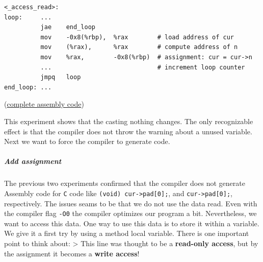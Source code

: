 \begin{verbatim}
<_access_read>:
loop:     ...
          jae    end_loop
          mov    -0x8(%rbp),  %rax        # load address of cur
          mov    (%rax),      %rax        # compute address of n
          mov    %rax,        -0x8(%rbp)  # assignment: cur = cur->n
          ...                             # increment loop counter
          jmpq   loop
end_loop: ...
\end{verbatim}

(\href{https://github.com/cksystemsgroup/SemanticLocality/blob/localizer/experiments/localizer/__meeting_20161130/assembly_tests/exp_ll_no_cast.txt}{complete
assembly code})

This experiment shows that the casting nothing changes. The only
recognizable effect is that the compiler does not throw the warning
about a unused variable. Next we want to force the compiler to generate
code.

\hypertarget{add-assignment}{\subparagraph{Add
assignment}\label{add-assignment}}

The previous two experiments confirmed that the compiler does not
generate Assembly code for \texttt{C} code like
\texttt{(void)\ cur-\textgreater{}pad{[}0{]};}, and
\texttt{cur-\textgreater{}pad{[}0{]};}, respectively. The issues seams
to be that we do not use the data read. Even with the compiler flag
\texttt{-O0} the compiler optimizes our program a bit. Nevertheless, we
want to access this data. One way to use this data is to store it within
a variable. We give it a first try by using a method local variable.
There is one important point to think about: \textgreater{} This line
was thought to be a \textbf{read-only access}, but by the assignment it
becomes a \textbf{write access}!

\begin{Shaded}
\begin{Highlighting}[]
  
   \NormalTok{l * cur = &list[}\NormalTok{];}
   
   
  \NormalTok{(} 
    \NormalTok{tmp = cur->pad[}\NormalTok{];}
  \NormalTok{\}}
   
\NormalTok{\}}
\end{Highlighting}
\end{Shaded}

